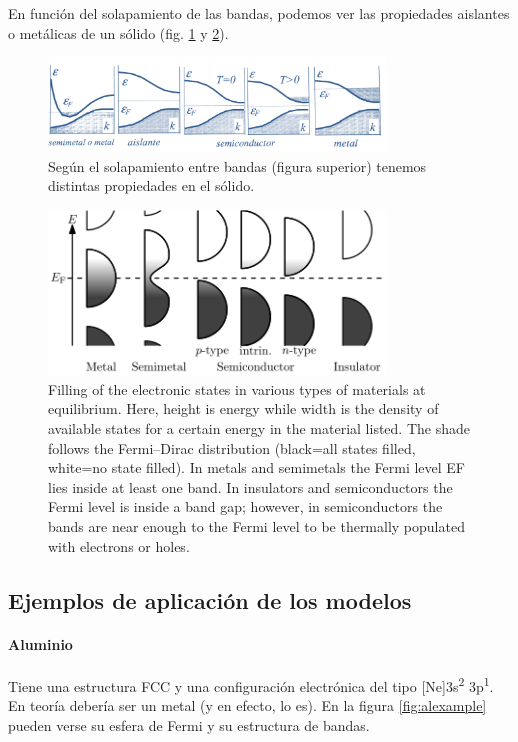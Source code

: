 En función del solapamiento de las bandas, podemos ver las propiedades
aislantes o metálicas de un sólido (fig. \ref{fig:bandclasification} y
\ref{fig:bandfill}).
\begin{figure}
  \centering
  \includegraphics[width=0.8\textwidth]{figures/bandclasification.png}
  \caption{Según el solapamiento entre bandas (figura superior)
    tenemos distintas propiedades en el sólido.}
  \label{fig:bandclasification}
\end{figure}

\begin{figure}
  \centering
  \includegraphics[width=0.8\textwidth]{figures/bandfill.png}
  \caption{Filling of the electronic states in various types of
    materials at equilibrium. Here, height is energy while width is
    the density of available states for a certain energy in the
    material listed. The shade follows the Fermi–Dirac distribution
    (black=all states filled, white=no state filled). In metals and
    semimetals the Fermi level EF lies inside at least one band. In
    insulators and semiconductors the Fermi level is inside a band
    gap; however, in semiconductors the bands are near enough to the
    Fermi level to be thermally populated with electrons or holes.}
  \label{fig:bandfill}
\end{figure}



\subsection{Ejemplos de aplicación de los modelos}

\paragraph{Aluminio}
Tiene una estructura FCC y una configuración electrónica del tipo
[Ne]3s\textsuperscript 2 3p\textsuperscript 1. En teoría debería ser
un metal (y en efecto, lo es). En la figura \ref{fig:alexample} pueden
verse su esfera de Fermi y su estructura de bandas.


